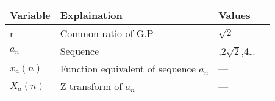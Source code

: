 \begin{table}[ht]
    \begin{tabular}{ | >{\centering\arraybackslash}m{2cm} | >{\centering\arraybackslash}m{3cm} | >{\centering\arraybackslash}m{2cm} | @{}m{0pt}@{} }
    \hline
    Variable & Explaination & Values &\\[10pt]
    \hline
    r & Common ratio of G.P & $\sqrt{2}$ &\\[10pt]
    \hline
    $a_n$ & Sequence & 2,$2\sqrt{2}$,4\dots &\\[10pt]
    \hline
    $x_a(n)$ & Function equivalent of sequence $a_n$ & --- &\\[10pt]
    \hline 
    $X_a(n)$ & Z-transform of $a_n$ & --- &\\[10pt]
    \hline 
    \end{tabular}
    \begin{center}
    \end{center}
\end{table}
